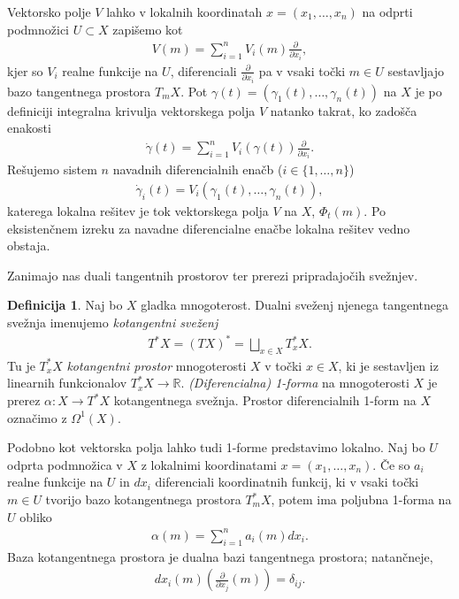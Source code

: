 \documentclass[12pt,a4paper,twoside]{article}
\theoremstyle{definition} %
\newtheorem{definicija}{Definicija}[section]
\theoremstyle{plain} %
\numberwithin{equation}{section}  %
\newcommand{\R}{\mathbb R}
\begin{document}
Vektorsko polje $V$ lahko v lokalnih koordinatah $x = (x_{1}, \dots, x_{n})$ na odprti podmnožici $U \subset X$ zapišemo kot 
\begin{align}
V(m) = \sum_{i=1}^{n} V_{i}(m) \frac{\partial}{\partial x_{i}},
\end{align}
kjer so $V_{i}$ realne funkcije na $U$, diferenciali $\frac{\partial}{\partial x_{i}}$ pa v vsaki točki $m \in U$ sestavljajo bazo tangentnega prostora $T_{m}X$.
Pot $\gamma (t) = (\gamma_{1}(t), \dots, \gamma_{n}(t))$ na $X$ je po definiciji integralna krivulja vektorskega polja $V$ natanko takrat, ko zadošča enakosti 
\begin{align*}
\dot{\gamma}(t) = \sum_{i=1}^{n} V_{i}(\gamma(t)) \frac{\partial}{\partial x_{i}}.
\end{align*}
Rešujemo sistem $n$ navadnih diferencialnih enačb ($i \in \{ 1, \dots , n \}$)
\begin{align*}
\dot{\gamma}_{i}(t) = V_{i}(\gamma_{1}(t), \dots, \gamma_{n}(t)),
\end{align*}
katerega lokalna rešitev je tok vektorskega polja $V$ na $X$, $\Phi_{t}(m)$. Po eksistenčnem izreku za navadne diferencialne enačbe lokalna rešitev vedno obstaja.

Zanimajo nas duali tangentnih prostorov ter prerezi pripradajočih svežnjev.

\begin{definicija}
Naj bo $X$ gladka mnogoterost. Dualni sveženj njenega tangentnega svežnja imenujemo \emph{kotangentni sveženj}
\begin{align}
T^{*}X = (TX)^{*} = \bigsqcup_{x \in X} T_{x}^{*}X.
\end{align}
Tu je $T_{x}^{*}X$ \emph{kotangentni prostor} mnogoterosti $X$ v točki $x \in X$, ki je sestavljen iz linearnih funkcionalov $T_{x}^{*}X \to \R$.
\emph{(Diferencialna) 1-forma} na mnogoterosti $X$ je prerez $\alpha \colon X \to T^{*}X$ kotangentnega svežnja. Prostor diferencialnih 1-form na $X$ označimo z $\Omega ^{1}(X)$.
\end{definicija}

Podobno kot vektorska polja lahko tudi 1-forme predstavimo lokalno. Naj bo $U$ odprta podmnožica v $X$ z lokalnimi koordinatami $x = (x_{1}, \dots, x_{n})$. Če so $a_{i}$ realne funkcije na $U$ in $dx_{i}$ diferenciali koordinatnih funkcij, ki v vsaki točki $m \in U$ tvorijo bazo kotangentnega prostora $T_{m}^{*}X$, potem ima poljubna 1-forma na $U$ obliko
\begin{align}
\alpha (m) = \sum_{i=1}^{n} a_{i}(m) dx_{i}.
\end{align}
Baza kotangentnega prostora je dualna bazi tangentnega prostora; natančneje, 
\begin{align*}
dx_{i}(m) \left(\frac{\partial}{\partial x_{j}} (m) \right) = \delta _{ij}.
\end{align*}
\end{document}
